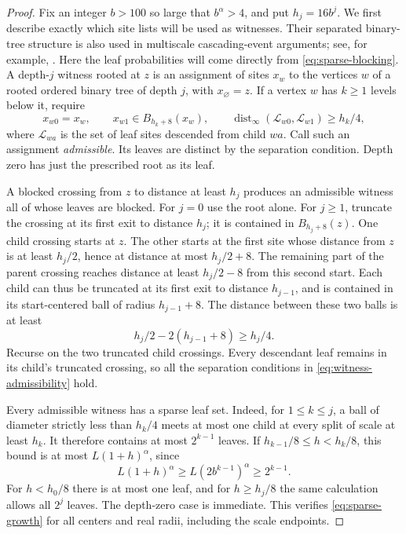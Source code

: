 \begin{proof}
Fix an integer \(b>100\) so large that \(b^\alpha>4\), and put
\(h_j=16b^j\).  We first describe exactly which site lists will be
used as witnesses.  Their separated binary-tree structure is also used
in multiscale cascading-event arguments; see, for example,
\cite[Section~3]{Sznitman2012}.  Here the leaf probabilities will come
directly from \eqref{eq:sparse-blocking}.  A depth-\(j\) witness rooted at \(z\) is an
assignment of sites \(x_w\) to the vertices \(w\) of a rooted ordered
binary tree of depth \(j\), with \(x_\varnothing=z\).  If a vertex
\(w\) has \(k\ge1\) levels below it, require
\begin{equation}\label{eq:witness-admissibility}
 x_{w0}=x_w,\qquad x_{w1}\in B_{h_k+8}(x_w),\qquad
 \operatorname{dist}_\infty(\mathcal L_{w0},\mathcal L_{w1})
       \ge h_k/4,
\end{equation}
where \(\mathcal L_{wa}\) is the set of leaf sites descended from
child \(wa\).  Call such an assignment \emph{admissible}.
Its leaves are distinct by the separation condition.  Depth zero has
just the prescribed root as its leaf.

A blocked crossing from \(z\) to distance at least \(h_j\) produces
an admissible witness all of whose leaves are blocked.  For \(j=0\)
use the root alone.  For \(j\ge1\), truncate the crossing at its
first exit to distance \(h_j\); it is
contained in \(B_{h_j+8}(z)\).  One child crossing starts at \(z\).
The other starts at the first site whose distance from \(z\) is at
least \(h_j/2\), hence at distance at most \(h_j/2+8\).
The remaining part of the parent crossing reaches distance at least
\(h_j/2-8\) from this second start.  Each child can thus be truncated
at its first exit to distance \(h_{j-1}\), and is contained in its
start-centered ball of radius \(h_{j-1}+8\).  The distance between
these two balls is at least
\[
 h_j/2-2(h_{j-1}+8)\ge h_j/4.
\]
Recurse on the two truncated child crossings.  Every descendant leaf
remains in its child's truncated crossing, so all the separation
conditions in \eqref{eq:witness-admissibility} hold.

Every admissible witness has a sparse leaf set.  Indeed, for
\(1\le k\le j\), a ball of diameter strictly less than \(h_k/4\)
meets at most one child at every split of scale at least \(h_k\).
It therefore contains at most \(2^{k-1}\) leaves.  If
\(h_{k-1}/8\le h<h_k/8\), this bound is at most
\(L(1+h)^\alpha\), since
\[
 L(1+h)^\alpha\ge L(2b^{k-1})^\alpha
       \ge 2^{k-1}.
\]
For \(h<h_0/8\) there is at most one leaf, and for
\(h\ge h_j/8\) the same calculation allows all \(2^j\) leaves.
The depth-zero case is immediate.  This verifies
\eqref{eq:sparse-growth} for all centers and real radii, including
the scale endpoints.


\end{proof}
